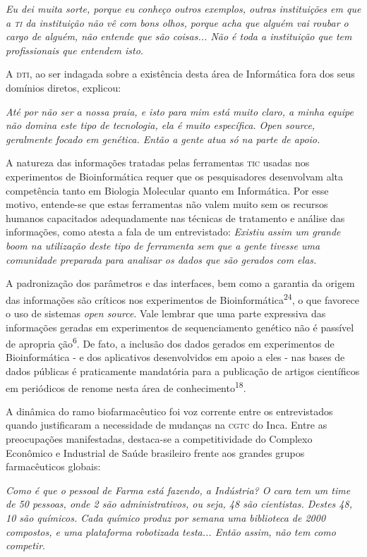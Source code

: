 \documentclass{article}
\begin{document}
\textit{Eu dei muita sorte, porque eu conheço outros exemplos, outras
instituições em que a \textsc{ti} da instituição não vê com bons olhos, porque acha que
alguém vai roubar o cargo de alguém, não entende que são coisas... Não é toda a
instituição que tem profissionais que entendem isto}.

A \textsc{dti}, ao ser indagada sobre a existência desta área de Informática fora dos
seus domínios diretos, explicou:

\textit{Até por não ser a nossa praia, e isto para mim está muito claro, a minha
equipe não domina este tipo de tecnologia, ela é muito específica. Open source,
geralmente focado em genética. Então a gente atua só na parte de apoio.}

A natureza das informações tratadas pelas ferramentas \textsc{tic} usadas nos
experimentos de Bioinformática requer que os pesquisadores desenvolvam alta
competência tanto em Biologia Molecular quanto em Informática. Por esse motivo,
entende-se que estas ferramentas não valem muito sem os recursos humanos
capacitados adequadamente nas técnicas de tratamento e análise das informações,
como atesta a fala de um entrevistado: \textit{Existiu assim um grande boom na
utilização deste tipo de ferramenta sem que a gente tivesse uma comunidade
preparada para analisar os dados que são gerados com elas.}

A padronização dos parâmetros e das interfaces, bem como a garantia da origem
das informações são críticos nos experimentos de
Bioinformática\textsuperscript{24}, o que favorece o uso de sistemas \textit{open source}. Vale lembrar que uma parte expressiva das informações geradas em experimentos
de sequenciamento genético não é passível de apropria ção\textsuperscript{6}. De fato, a inclusão dos dados gerados em experimentos de Bioinformática - e
dos aplicativos desenvolvidos em apoio a eles - nas bases de dados públicas é
praticamente mandatória para a publicação de artigos científicos em periódicos
de renome nesta área de conhecimento\textsuperscript{18}.

A dinâmica do ramo biofarmacêutico foi voz corrente entre os entrevistados
quando justificaram a necessidade de mudanças na \textsc{cgtc} do Inca. Entre as
preocupações manifestadas, destaca-se a competitividade do Complexo Econômico e
Industrial de Saúde brasileiro frente aos grandes grupos farmacêuticos globais:

\textit{Como é que o pessoal de Farma está fazendo, a Indústria? O cara tem um
time de 50 pessoas, onde 2 são administrativos, ou seja, 48 são cientistas.
Destes 48, 10 são químicos. Cada químico produz por semana uma biblioteca de
2000 compostos, e uma plataforma robotizada testa... Então assim, não tem como
competir}.
\end{document}

